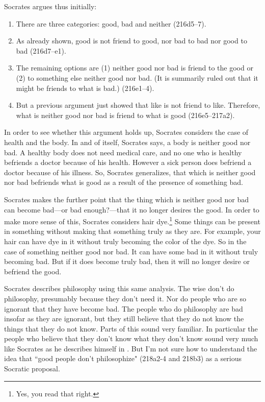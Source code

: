 \documentclass[11pt]{article}
\begin{document}
Socrates argues thus initially:

\begin{enumerate}

    \item There are three categories: good, bad and neither (216d5--7).

    \item As already shown, good is not friend to good, nor bad to bad nor good
        to bad (216d7--e1).

    \item The remaining options are (1) neither good nor bad is friend to the
        good or (2) to something else neither good nor bad.  (It is summarily
        ruled out that it might be friends to what is bad.) (216e1--4).

    \item But a previous argument just showed that like is not friend to like.
        Therefore, what is neither good nor bad is friend to what is good
        (216e5--217a2).

\end{enumerate}

In order to see whether this argument holds up, Socrates considers the case of
health and the body.  In and of itself, Socrates says, a body is neither good
nor bad.  A healthy body does not need medical care, and no one who is healthy
befriends a doctor because of his health.  However a sick person does befriend
a doctor because of his illness.  So, Socrates generalizes, that which is
neither good nor bad befriends what is good as a result of the presence of
something bad.

Socrates makes the further point that the thing which is neither good nor bad
can become bad---or bad enough?---that it no longer desires the good.  In order
to make more sense of this, Socrates considers hair dye.\footnote{Yes, you read
that right.}  Some things can be present in something without making that
something truly as they are.  For example, your hair can have dye in it without
truly becoming the color of the dye.  So in the case of something neither good
nor bad.  It can have some bad in it without truly becoming bad.  But if it
does become truly bad, then it will no longer desire or befriend the good.

Socrates describes philosophy using this same analysis.  The wise don't do
philosophy, presumably because they don't need it.  Nor do people who are so
ignorant that they have become bad.  The people who do philosophy are bad
insofar as they are ignorant, but they still believe that they do not know the
things that they do not know.  Parts of this sound very familiar.  In
particular the people who believe that they don't know what they don't know
sound very much like Socrates as he describes himself in .  But
I'm not sure how to understand the idea that ``good people don't philosophize"
(218a2-4 and 218b3) as a serious Socratic proposal.
\end{document}
